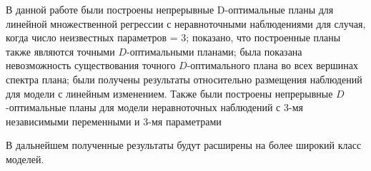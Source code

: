 В данной работе были построены непрерывные D-оптимальные планы для линейной множественной регрессии с неравноточными наблюдениями для случая, когда число неизвестных параметров = 3; показано, что построенные планы также являются точными $D$-оптимальными планами; была показана невозможность существования точного $D$-оптимального плана во всех вершинах спектра плана; были получены результаты относительно размещения наблюдений для модели с линейным изменением. Также были построены непрерывные $D$-оптимальные планы для модели неравноточных наблюдений с 3-мя независимыми переменными и 3-мя параметрами

В дальнейшем полученные результаты будут расширены на более широкий класс моделей.